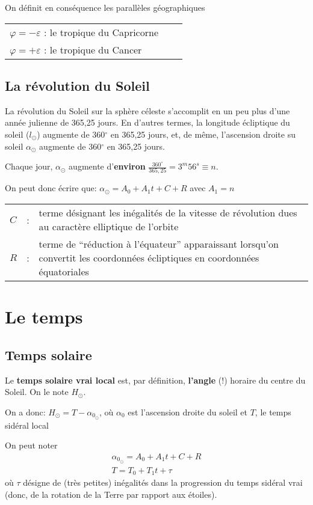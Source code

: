 \documentclass[12pt]{report}
\def\sun{\odot}
\begin{document}
 On définit en conséquence  les parallèles géographiques   
\begin{tabular}{lll}
$\varphi = - \varepsilon$ : le tropique du Capricorne \\
$\varphi = + \varepsilon$ : le tropique du Cancer 
\end{tabular}


\section{La révolution du Soleil}



La révolution du Soleil sur la sphère céleste s'accomplit en un peu plus d'une année julienne de 365,25 jours. En d'autres termes, la longitude écliptique du soleil ($l_\sun$) augmente de 360$^\circ$ en 365,25 jours, et, de même, l'ascension droite su soleil $\alpha_\sun$ augmente de 360$^\circ$ en 365,25 jours. 

Chaque jour, $\alpha_\sun$ augmente d'\textbf{environ} $\frac{360^\circ}{365,25}=3^m56^s \equiv n$. 

On peut donc écrire que: $\alpha_{\odot} = A_0 + A_1 t + C + R$ avec $A_1=n$

\begin{tabular}{llp{15cm}}
$C$ &:& terme désignant les inégalités de la vitesse de révolution dues au caractère elliptique de l'orbite  \\
$R$ &:& {terme de ``réduction à l'équateur'' apparaissant lorsqu'on convertit les coordonnées écliptiques en coordonnées équatoriales}
\end{tabular}

\chapter{Le temps}
\section{Temps solaire}
Le \textbf{temps solaire vrai local} est, par définition, \textbf{l'angle} (!) horaire du centre du Soleil. On le note $H_\sun$. 

On a donc: $H_{\odot} = T-\alpha_{0_\odot}$, où $\alpha_0$ est l'ascension droite du soleil et $T$, le temps sidéral local


On peut noter
$$
\begin{array}{llll}
\alpha_{0_\odot} = A_0 + A_1 t + C + R \\
T = T_0 + T_1 t + \tau
\end{array}
$$
où $\tau$ désigne de (très petites) inégalités dans la progression du temps sidéral vrai (donc, de la rotation de la Terre par rapport aux étoiles). 
\end{document}
